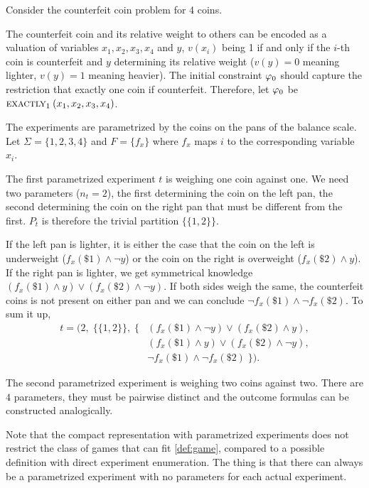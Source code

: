 \begin{example} \label{ex:run1}
Consider the counterfeit coin problem for 4 coins.

The counterfeit coin and its relative weight to others can be encoded
  as a valuation of variables $x_1, x_2, x_3, x_4$ and $y$,
  $v(x_i)$ being 1 if and only if the $i$-th coin is counterfeit and
  $y$ determining its relative weight
  ($v(y) = 0$ meaning lighter, $v(y) = 1$ meaning heavier).
The initial constraint $\varphi_0$ should capture the restriction that exactly one
  coin if counterfeit.
Therefore, let $\varphi_0$ be $\textsc{exactly}_{1}\:(x_1, x_2, x_3, x_4)$.

The experiments are parametrized by the coins on the pans of the balance scale.
Let $\Sigma = \{1, 2, 3, 4\}$ and $F = \{ f_x \}$ where $f_x$
maps $i$ to the corresponding variable $x_i$.

The first parametrized experiment $t$ is weighing one coin against one.
We need two parameters ($n_t = 2$),
  the first determining the coin on the left pan,
  the second determining the coin on the right pan that must be different
  from the first.
$P_t$ is therefore the trivial partition $\{\{1, 2\}\}$.

If the left pan is lighter, it is either the case that the
  coin on the left is underweight ($f_x(\$1) \wedge \neg y$)
  or the coin on the right is overweight ($f_x(\$2) \wedge y$).
If the right pan is lighter, we get symmetrical knowledge
  $(f_x(\$1)\wedge y) \vee (f_x(\$2)\wedge\neg y)$.
If both sides weigh the same, the counterfeit coins is not present on either pan
  and we can conclude $\neg f_x(\$1) \wedge \neg f_x(\$2)$.
To sum it up,
\begin{align*}
  t = \big(2,\; \big\{\{1,2\}\big\},\; \big\{ &
    (f_x(\$1)\wedge \neg y) \vee (f_x(\$2)\wedge y), \\
    & (f_x(\$1)\wedge y) \vee (f_x(\$2)\wedge\neg y), \\
    & \neg f_x(\$1) \wedge \neg f_x(\$2) \;\big\}\big).
\end{align*}

The second parametrized experiment is weighing two coins against two.
There are $4$ parameters, they must be pairwise distinct and the outcome
  formulas can be constructed analogically. \eqed
\end{example}


Note that the compact representation with parametrized experiments
  does not restrict the class of games that can fit \autoref{def:game},
  compared to a possible definition with direct experiment enumeration.
The thing is that there can always be a parametrized experiment
  with no parameters for each actual experiment.

